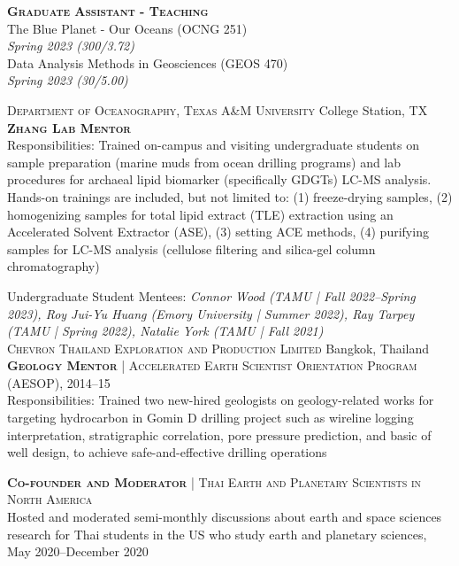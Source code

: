 \documentclass[10pt]{article}
\newcommand{\margintext}[1]{\marginnote{\normalsize\textbf #1 |}}
\begin{document}
\bigskip
\textbf{\textsc{Graduate Assistant - Teaching}} \\
The Blue Planet - Our Oceans (OCNG 251) \\
\textit{Spring 2023 (300/3.72)} \\
Data Analysis Methods in Geosciences (GEOS 470) \\
\textit{Spring 2023 (30/5.00)}

\bigskip
\margintext{Mentoring}
\textsc{Department of Oceanography, Texas A\&M University} \hfill College Station, TX \\
\textsc{\textbf{Zhang Lab Mentor}}\\
\footnotesize 
{\color{gray} Responsibilities: Trained on-campus and visiting undergraduate students on sample preparation (marine muds from ocean drilling programs) and lab procedures for archaeal lipid biomarker (specifically GDGTs) LC-MS analysis. Hands-on trainings are included, but not limited to: (1) freeze-drying samples, (2) homogenizing samples for total lipid extract (TLE) extraction using an Accelerated Solvent Extractor (ASE), (3) setting ACE methods, (4) purifying samples for LC-MS analysis (cellulose filtering and silica-gel column chromatography)}

\normalsize
\bigskip
Undergraduate Student Mentees: \textit{Connor Wood (TAMU | Fall 2022–Spring 2023), Roy Jui-Yu Huang (Emory University | Summer 2022), Ray Tarpey (TAMU | Spring 2022), Natalie York (TAMU | Fall 2021)} \\

\textsc{Chevron Thailand Exploration and Production Limited} \hfill Bangkok, Thailand \\
\textsc{\textbf{Geology Mentor}} | \textsc{Accelerated Earth Scientist Orientation Program (AESOP)}, 2014–15 \\
\footnotesize 
{\color{gray} Responsibilities: Trained two new-hired geologists on geology-related works for targeting hydrocarbon in Gomin D drilling project such as wireline logging interpretation, stratigraphic correlation, pore pressure prediction, and basic of well design, to achieve safe-and-effective drilling operations}

\normalsize
\bigskip
\margintext{Leaderships}
\textsc{\textbf{Co-founder and Moderator}} | \textsc{Thai Earth and Planetary Scientists in North America} \\
Hosted and moderated semi-monthly discussions about earth and space sciences research for Thai students in the US who study earth and planetary sciences, May 2020–December 2020
\end{document}
